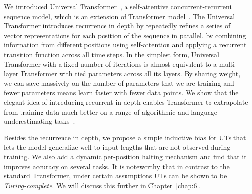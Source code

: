 We introduced Universal Transformer~\citep{Dehghani:ICLR:2019}, a self-attentive concurrent-recurrent sequence model, which is an extension of Transformer model~\citep{vaswani2017attention}. The Universal Transformer introduces recurrence in depth by repeatedly refines a series of vector representations for each position of the sequence in parallel, by combining information from different positions using self-attention and applying a recurrent transition function across all time steps. 
In the simplest form, Universal Transformer with a fixed number of iterations is almost equivalent to a multi-layer Transformer with tied parameters across all its layers. By sharing weight, we can save massively on the number of parameters that we are training and fewer parameters means learn faster with fewer data points. We show that the elegant idea of introducing recurrent in depth enables Transformer to extrapolate from training data much better on a range of algorithmic and language underestimating tasks~\cite{Dehghani:ICLR:2019, Dehghani:2019:WSDM}.

Besides the recurrence in depth, we propose a simple inductive bias for UTs that lets the model generalize well to input lengths that are not observed during training.  We also add a dynamic per-position halting mechanism and find that it improves accuracy on several tasks.  It is noteworthy that in contrast to the standard Transformer, under certain assumptions UTs can be shown to be \emph{Turing-complete}. We will discuss this further in Chapter~\ref{chap:6}.


